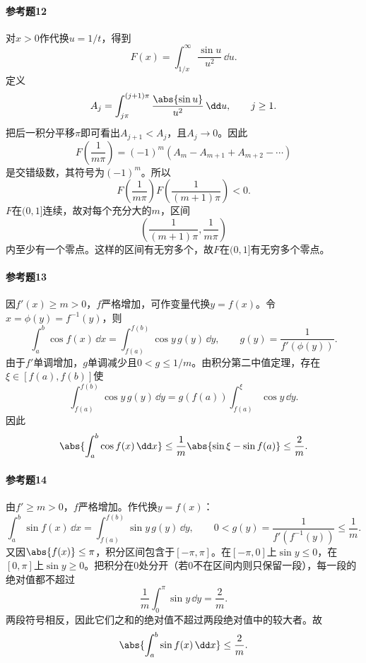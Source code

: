 \paragraph{参考题12}
\begin{xsolution}
对$x>0$作代换$u=1/t$，得到
\[
 F(x)=\int_{1/x}^{\infty}\frac{\sin u}{u^2}\,\dd u.
\]
定义
\[
 A_j=\int_{j\pi}^{(j+1)\pi}\frac{\abs{\sin u}}{u^2}\,\dd u,
 \qquad j\ge1.
\]
把后一积分平移$\pi$即可看出$A_{j+1}<A_j$，且$A_j\to0$。因此
\[
 F\left(\frac1{m\pi}\right)
 =(-1)^m(A_m-A_{m+1}+A_{m+2}-\cdots)
\]
是交错级数，其符号为$(-1)^m$。所以
\[
 F\left(\frac1{m\pi}\right)
 F\left(\frac1{(m+1)\pi}\right)<0.
\]
$F$在$(0,1]$连续，故对每个充分大的$m$，区间
\[
 \left(\frac1{(m+1)\pi},\frac1{m\pi}\right)
\]
内至少有一个零点。这样的区间有无穷多个，故$F$在$(0,1]$有无穷多个零点。
\end{xsolution}

\paragraph{参考题13}
\begin{xsolution}
因$f'(x)\ge m>0$，$f$严格增加，可作变量代换$y=f(x)$。令$x=\phi(y)=f^{-1}(y)$，则
\[
 \int_a^b\cos f(x)\,\dd x
 =\int_{f(a)}^{f(b)}\cos y\,g(y)\,\dd y,
 \qquad
 g(y)=\frac1{f'(\phi(y))}.
\]
由于$f'$单调增加，$g$单调减少且$0<g\le1/m$。由积分第二中值定理，存在$\xi\in[f(a),f(b)]$使
\[
 \int_{f(a)}^{f(b)}\cos y\,g(y)\,\dd y
 =g(f(a))\int_{f(a)}^\xi\cos y\,\dd y.
\]
因此
\[
 \abs{\int_a^b\cos f(x)\,\dd x}
 \le\frac1m\abs{\sin\xi-\sin f(a)}
 \le\frac2m.
\]
\end{xsolution}

\paragraph{参考题14}
\begin{xsolution}
由$f'\ge m>0$，$f$严格增加。作代换$y=f(x)$：
\[
 \int_a^b\sin f(x)\,\dd x
 =\int_{f(a)}^{f(b)}\sin y\,g(y)\,\dd y,
 \qquad 0<g(y)=\frac1{f'(f^{-1}(y))}\le\frac1m.
\]
又因$\abs{f(x)}\le\pi$，积分区间包含于$[-\pi,\pi]$。在$[-\pi,0]$上$\sin y\le0$，在$[0,\pi]$上$\sin y\ge0$。把积分在0处分开（若0不在区间内则只保留一段），每一段的绝对值都不超过
\[
 \frac1m\int_0^\pi\sin y\,\dd y=\frac2m.
\]
两段符号相反，因此它们之和的绝对值不超过两段绝对值中的较大者。故
\[
 \abs{\int_a^b\sin f(x)\,\dd x}\le\frac2m.
\]
\end{xsolution}

